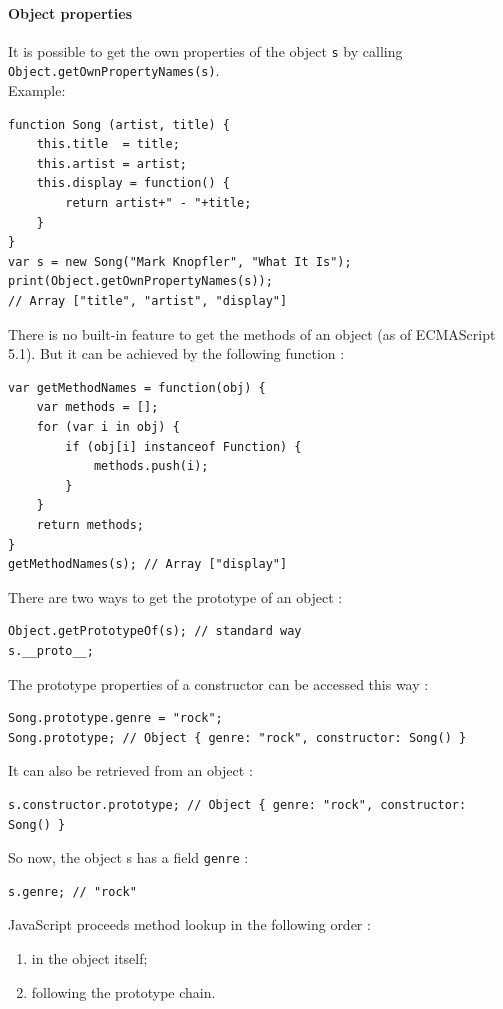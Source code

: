 \documentclass[a4paper,10pt]{article}
\begin{document}
\paragraph{Object properties}{
It is possible to get the own properties of the object \lstinline|s| by calling \lstinline|Object.getOwnPropertyNames(s)|. \\
Example:
\begin{lstlisting}
function Song (artist, title) {
    this.title  = title;
    this.artist = artist;
    this.display = function() {
        return artist+" - "+title;
    }
}
var s = new Song("Mark Knopfler", "What It Is");
print(Object.getOwnPropertyNames(s));
// Array ["title", "artist", "display"]
\end{lstlisting}
}


There is no built-in feature to get the methods of an object (as of ECMAScript 5.1). But it can be achieved by the following function :
\begin{lstlisting}
var getMethodNames = function(obj) {
    var methods = [];
    for (var i in obj) {
        if (obj[i] instanceof Function) {
            methods.push(i);
        }
    }
    return methods;
}
getMethodNames(s); // Array ["display"]
\end{lstlisting}


There are two ways to get the prototype of an object :
\begin{lstlisting}
Object.getPrototypeOf(s); // standard way
s.__proto__;
\end{lstlisting}


The prototype properties of a constructor can be accessed this way :
\begin{lstlisting}
Song.prototype.genre = "rock";
Song.prototype; // Object { genre: "rock", constructor: Song() }
\end{lstlisting}

It can also be retrieved from an object :
\begin{lstlisting}
s.constructor.prototype; // Object { genre: "rock", constructor: Song() }
\end{lstlisting}

So now, the object s has a field \lstinline|genre| :
\begin{lstlisting}
s.genre; // "rock"
\end{lstlisting}

JavaScript proceeds method lookup in the following order :
\begin{enumerate}
\item in the object itself;
\item following the prototype chain.
\end{enumerate}
\end{document}
